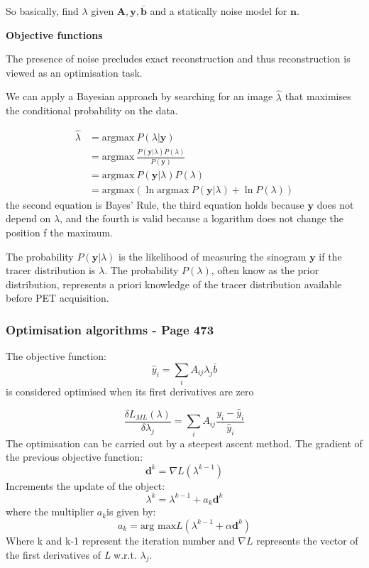 \documentclass{article}
\begin{document}
So basically, find $\lambda$ given $\textbf{A},\textbf{y},\bar{\textbf{b}}$ and a statically noise model for $\textbf{n}$. 

\textbf{Objective functions}

The presence of noise precludes exact reconstruction and thus reconstruction is viewed as an optimisation task.

We can apply a Bayesian approach by searching for an image $\hat{\lambda}$ that maximises the conditional probability on the data.

\begin{equation}
\begin{split}
\hat{\lambda} &= \text{argmax} \ P(\lambda|\textbf{y}) \\ 
&= \text{argmax} \ \frac{P(\textbf{y}|\lambda)P(\lambda)}{P(\textbf{y})} \\
&= \text{argmax} \ P(\textbf{y}|\lambda)P(\lambda)\\
&= \text{argmax} (\ln{\text{argmax} \ P(\textbf{y}|\lambda)}  + \ln{P(\lambda)}  )
\end{split}
\end{equation}
the second equation is Bayes' Rule, the third equation holds because $\textbf{y}$ does not depend on $\lambda$, and the fourth is valid because a logarithm does not change the position f the maximum.

The probability $P(\textbf{y}|\lambda)$ is the likelihood of measuring the sinogram $\textbf{y}$ if the tracer distribution is $\lambda$. The probability $P(\lambda)$, often know as the prior distribution, represents a priori knowledge of the tracer distribution available before PET acquisition.
 
 \subsubsection{\textbf{Optimisation algorithms - Page 473}}
The objective function:
\begin{equation}
\hat{y}_i = \sum_i A_{ij}\lambda_j  \bar{b}
\end{equation}
is considered optimised when its first derivatives are zero

\begin{equation}
\frac{\delta L_{ML}(\lambda)}{\delta\lambda_j}=\sum_i A_{ij} \frac{y_i - \hat{y}_i}{\hat{y}_i} 
\end{equation}
 The optimisation can be carried out by a steepest ascent method. The gradient of the previous objective function:
 \begin{equation}
 \textbf{d}^k= \nabla  L(\lambda^{k-1})
 \end{equation}
 Increments the update of the object:
 \begin{equation}
 \lambda^k = \lambda^{k-1} +a_k \textbf{d}^k
 \end{equation}
 where the multiplier $a_k$is given by:
\begin{equation}
a_k = \text{arg max} L(\lambda^{k-1} +\alpha\textbf{d}^k )
\end{equation}
Where k and k-1 represent the iteration number and $\nabla L$ represents the vector of the first derivatives of \textit{L} w.r.t. $\lambda_j$.
\end{document}
